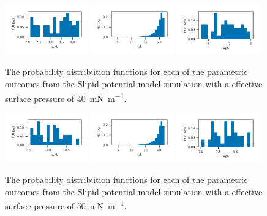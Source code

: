 \documentclass[amsmath,amssymb,superscriptaddress]{revtex4-1}
\begin{document}
%
%
\begin{figure}
 \centering
 \includegraphics[width=0.32\textwidth]{slipids_40_dh}
 \includegraphics[width=0.32\textwidth]{slipids_40_tt}
 \includegraphics[width=0.32\textwidth]{slipids_40_wph}
 \caption{The probability distribution functions for each of the parametric outcomes from the Slipid potential model simulation with a effective surface pressure of \SI{40}{\milli\newton\per\meter}.}
 \label{fig:sl40}
\end{figure}
%
%
\begin{figure}
 \centering
 \includegraphics[width=0.32\textwidth]{slipids_50_dh}
 \includegraphics[width=0.32\textwidth]{slipids_50_tt}
 \includegraphics[width=0.32\textwidth]{slipids_50_wph}
 \caption{The probability distribution functions for each of the parametric outcomes from the Slipid potential model simulation with a effective surface pressure of \SI{50}{\milli\newton\per\meter}.}
 \label{fig:sl50}
\end{figure}
\end{document}

